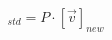 \documentclass[preview]{standalone}
\begin{document}
\begin{align*}
[\vec{v}]_{std} = P \cdot [\vec{v}]_{new}
\end{align*}
\end{document}
